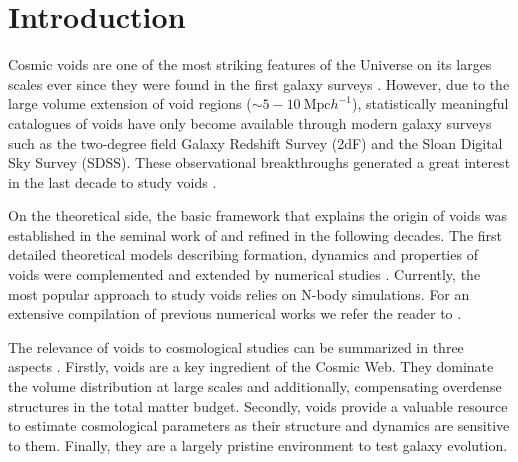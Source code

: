 \documentclass[a4,useAMS,usenatbib,usegraphicx]{mn2e}
\begin{document}

\section{Introduction}
\label{sec:introduction}

Cosmic voids are one of the most striking features of the
Universe on its larges scales ever since they were found in the first
galaxy surveys \citep{Chincarini75, Gregory78, Einasto80M, Einasto80N,
  Kirshner81, Zeldovich82,Kirshner87}.  
However, due to the large volume extension of void regions ($\sim
5-10\ \mbox{Mpc}  h^{-1}$), statistically meaningful catalogues of
voids \citep{Pan10,  Sutter12b, Nadathur14} have only become available
through modern galaxy surveys such as the two-degree field Galaxy
Redshift Survey (2dF) \citep{ Colless01, Colless03} and the Sloan
Digital Sky Survey (SDSS)\citep{York00, Abazajian03}.
These observational breakthroughs generated a great interest in the last
decade to study voids \citep{Hoyle04, Croton04, Rojas05,
  Ceccarelli06, Patiri06a, Tikhonov06, Patiri06b,Tikhonov07,
  BendaBeckmann08, Foster09, Ceccarelli13, Sutter14a}. 


On the theoretical side, the basic framework that explains
the origin of voids was established in the seminal work of
\citet{Zeldovich70} and refined in the following decades.  
The first detailed theoretical models describing formation, dynamics
and properties of  voids \citep{Hoffman82, Icke84, Bertschinger85,
  Blumenthal92} were  complemented and extended by numerical studies
\citep{Martel90, Regos91, Weygaert93, Dubinski93, Bond96}. 
Currently, the most popular approach to study voids relies on N-body
simulations. For an extensive compilation of previous  
numerical works we refer the reader to \citet{Colberg08}.


The relevance of voids to cosmological studies can be summarized in
three aspects \citep{Platen07}. 
Firstly, voids are a key ingredient of the Cosmic Web. 
They dominate the volume distribution at large scales and
additionally, compensating overdense structures in the total matter
budget. 
Secondly, voids provide a valuable resource to estimate  
cosmological parameters as their structure and dynamics are sensitive
to them. 
Finally, they are a largely pristine environment to test galaxy
evolution. 
\end{document}
